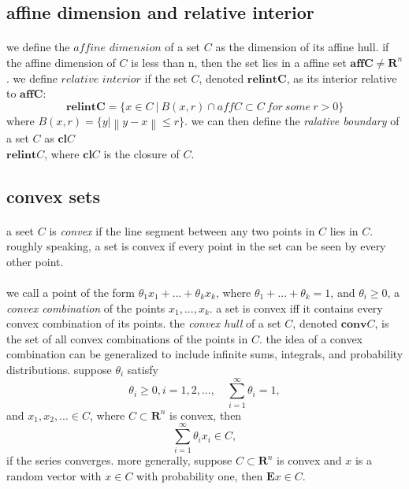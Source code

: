 \documentclass{article}
\begin{document}
  \subsection{affine dimension and relative interior}
    \paragraph{} we define the $\textit{affine dimension}$ of a set $C$ as the dimension of its affine hull. if the affine dimension of $C$ is less than n, then the set lies in a affine set $\mathbf{aff C} \neq \mathbf{R}^n$. we define $\textit{relative interior}$ if the set $C$, denoted $\mathbf{relintC}$, as its interior relative to $\mathbf{affC}$:
    \begin{equation}
      \mathbf{relintC} = \{ x \in C\  |\  B(x, r) \cap \textit{aff}C \subset C \ for\ some\ r > 0\}
    \end{equation}
    where $B(x, r) = \{y | \left \| y - x \right \| \leq r\}$. we can then define the \textit{ralative boundary} of a set $C$ as $\mathbf{cl}C$ \\ $\mathbf{relint}C$, where $\mathbf{cl}C$ is the closure of $C$.
  \subsection{convex sets}
    \paragraph{} a seet $C$ is \textit{convex} if the line segment between any two points in $C$ lies in $C$. roughly speaking, a set is convex if every point in the set can be seen by every other point.
    \paragraph{} we call a point of the form $\theta_1 x_1 + ... + \theta_k x_k$, where $\theta_1 +...+ \theta_k = 1$, and $\theta_i \ge 0$, a \textit{convex combination} of the points $x_1,..., x_k$. a set is convex iff it contains every convex combination of its points. the \textit{convex hull} of a set $C$, denoted $\mathbf{conv} C$, is the set of all convex combinations of the points in $C$. the idea of a convex combination can be generalized to include infinite sums, integrals, and probability distributions. suppose $\theta_i$ satisfy
    \begin{equation}
      \theta_i \ge 0, i = 1,2,...,\quad \sum_{i = 1}^{\infty} \theta_i = 1,
    \end{equation}
    and $x_1, x_2,... \in C$, where $C \subset \mathbf{R}^n$ is convex, then
    \begin{equation}
      \sum_{i = 1}^{\infty} \theta_i x_i \in C,
    \end{equation}
    if the series converges. more generally, suppose $C \subset \mathbf{R}^n$ is convex and $x$ is a random vector with $x \in C$ with probability one, then $\mathbf{E}x \in C$.
\end{document}
